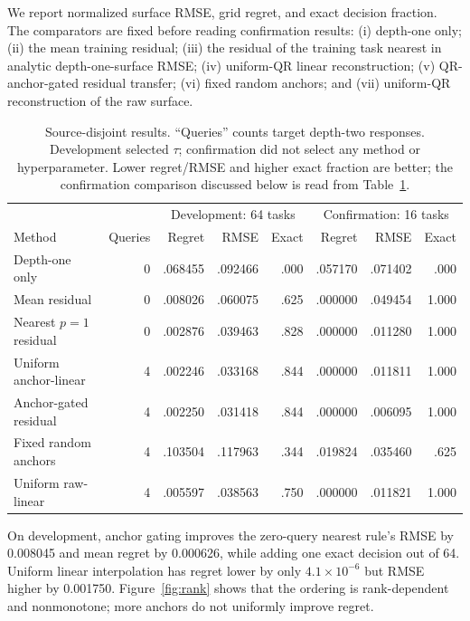 \documentclass[10pt,letterpaper,twoside]{article}
\begin{document}
We report normalized surface RMSE, grid regret, and exact decision fraction.
The comparators are fixed before reading confirmation results:
(i) depth-one only; (ii) the mean training residual; (iii) the residual of the
training task nearest in analytic depth-one-surface RMSE; (iv) uniform-QR
linear reconstruction; (v) QR-anchor-gated residual transfer; (vi) fixed
random anchors; and (vii) uniform-QR reconstruction of the raw surface.

\begin{table}[t]
\caption{Source-disjoint results.  ``Queries'' counts target depth-two
responses.  Development selected $\tau$; confirmation did not select any
method or hyperparameter.  Lower regret/RMSE and higher exact fraction are
better; the confirmation comparison discussed below is read from
Table~\ref{tab:results}.}
\label{tab:results}
\begin{ruledtabular}
\begin{tabular}{lrrrrrrr}
& & \multicolumn{3}{c}{Development: 64 tasks} &
\multicolumn{3}{c}{Confirmation: 16 tasks}\\
Method & Queries & Regret & RMSE & Exact & Regret & RMSE & Exact\\
\hline
Depth-one only & 0 & .068455 & .092466 & .000 & .057170 & .071402 & .000\\
Mean residual & 0 & .008026 & .060075 & .625 & .000000 & .049454 & 1.000\\
Nearest $p=1$ residual & 0 & .002876 & .039463 & .828 & .000000 & .011280 & 1.000\\
Uniform anchor-linear & 4 & .002246 & .033168 & .844 & .000000 & .011811 & 1.000\\
Anchor-gated residual & 4 & .002250 & .031418 & .844 & .000000 & .006095 & 1.000\\
Fixed random anchors & 4 & .103504 & .117963 & .344 & .019824 & .035460 & .625\\
Uniform raw-linear & 4 & .005597 & .038563 & .750 & .000000 & .011821 & 1.000\\
\end{tabular}
\end{ruledtabular}
\end{table}

On development, anchor gating improves the zero-query nearest rule's RMSE by
0.008045 and mean regret by 0.000626, while adding one exact decision out of
64.  Uniform linear interpolation has regret lower by only
$4.1\times10^{-6}$ but RMSE higher by 0.001750.  Figure~\ref{fig:rank} shows
that the ordering is rank-dependent and nonmonotone; more anchors do not
uniformly improve regret.
\end{document}
